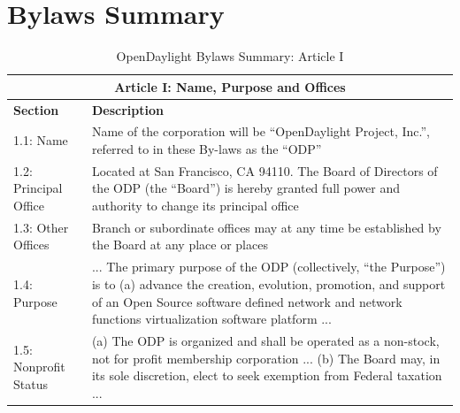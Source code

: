 \documentclass[a4paper, 12pt]{book}
\begin{document}
{%
\chapter{Bylaws Summary}
\label{chap:appendix_bylaws}
\begin{table}[H]
  \begin{center}
    \begin{tabular}{ | p{4cm} | p{11cm} | }
    \toprule
    \multicolumn {2}{|c|}{\textbf{Article I: Name, Purpose and Offices}} \\
    \hline
    \textbf{Section} & \textbf{Description} \\
    \hline
    1.1: Name & Name of the corporation will be “OpenDaylight Project, Inc.”, referred to in these By-laws as the “ODP” \\
    \hline
    1.2: Principal Office & Located at San Francisco, CA 94110.  The Board of Directors of the ODP (the “Board”) is hereby granted full power and authority to change its principal office \\
    \hline
    1.3: Other Offices & Branch or subordinate offices may at any time be established by the Board at any place or places \\
    \hline
    1.4: Purpose & ... The primary purpose of the ODP (collectively, “the Purpose”) is to (a) advance the creation, evolution, promotion, and support of an Open Source software defined network and network functions virtualization software platform ... \\
    \hline
    1.5: Nonprofit Status & (a) The ODP is organized and shall be operated as a non-stock, not for profit membership corporation ... (b) The Board may, in its sole discretion, elect to seek exemption from Federal taxation ...\\
    \bottomrule
    \end{tabular}
    \caption{OpenDaylight Bylaws Summary: Article I}
    \label{tab:odlbylaws-art01}
  \end{center}
\end{table}

}
\end{document}
